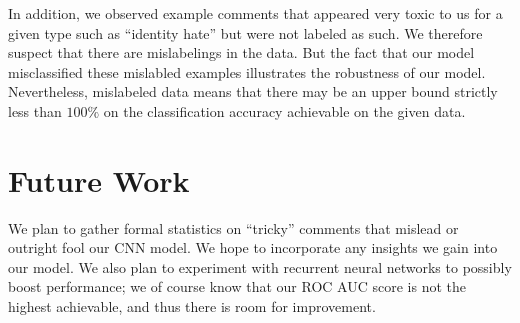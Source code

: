 \documentclass[12pt]{article}
\begin{document}
In addition, we observed example comments that appeared very toxic to us for a given type such as ``identity hate'' but were not labeled as such. We therefore suspect that there are mislabelings in the data. But the fact that our model misclassified these mislabled examples illustrates the robustness of our model. Nevertheless, mislabeled data means that there may be an upper bound strictly less than $100\%$ on the classification accuracy achievable on the given data.


\section{Future Work}

We plan to gather formal statistics on ``tricky'' comments that mislead or outright fool our CNN model. We hope to incorporate any insights we gain into our model. We also plan to experiment with recurrent neural networks to possibly boost performance; we of course know that our ROC AUC score is not the highest achievable, and thus there is room for improvement.




\end{document}
